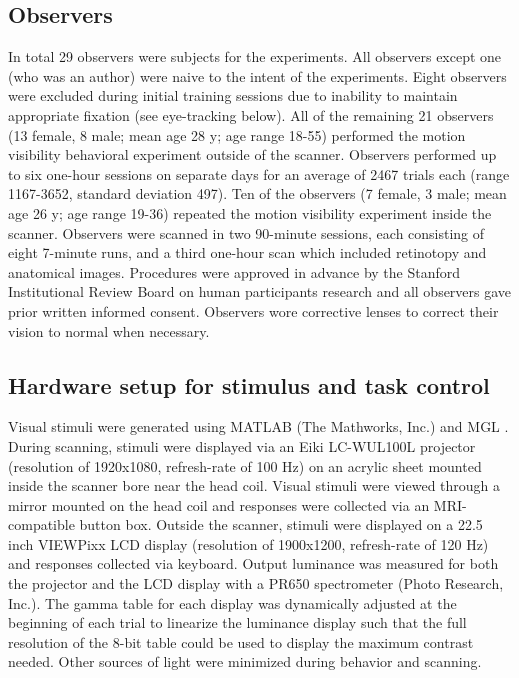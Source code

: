 \documentclass{report}
\begin{document}
\subsection{Observers}
In total 29 observers were subjects for the experiments. All observers except one (who was an author) were naive to the intent of the experiments. Eight observers were excluded during initial training sessions due to inability to maintain appropriate fixation (see eye-tracking below). All of the remaining 21 observers (13 female, 8 male; mean age 28 y; age range 18-55) performed the motion visibility behavioral experiment outside of the scanner. Observers performed up to six one-hour sessions on separate days for an average of 2467 trials each (range 1167-3652, standard deviation 497). Ten of the observers (7 female, 3 male; mean age 26 y; age range 19-36) repeated the motion visibility experiment inside the scanner. Observers were scanned in two 90-minute sessions, each consisting of eight 7-minute runs, and a third one-hour scan which included retinotopy and anatomical images. Procedures were approved in advance by the Stanford Institutional Review Board on human participants research and all observers gave prior written informed consent. Observers wore corrective lenses to correct their vision to normal when necessary.

\subsection{Hardware setup for stimulus and task control}

Visual stimuli were generated using MATLAB (The Mathworks, Inc.) and MGL \citep{Gardner2018-uq}. During scanning, stimuli were displayed via an Eiki LC-WUL100L projector (resolution of 1920x1080, refresh-rate of 100 Hz) on an acrylic sheet mounted inside the scanner bore near the head coil. Visual stimuli were viewed through a mirror mounted on the head coil and responses were collected via an MRI-compatible button box. Outside the scanner, stimuli were displayed on a 22.5 inch VIEWPixx LCD display (resolution of 1900x1200, refresh-rate of 120 Hz) and responses collected via keyboard. Output luminance was measured for both the projector and the LCD display with a PR650 spectrometer (Photo Research, Inc.). The gamma table for each display was dynamically adjusted at the beginning of each trial to linearize the luminance display such that the full resolution of the 8-bit table could be used to display the maximum contrast needed. Other sources of light were minimized during behavior and scanning.
\end{document}
